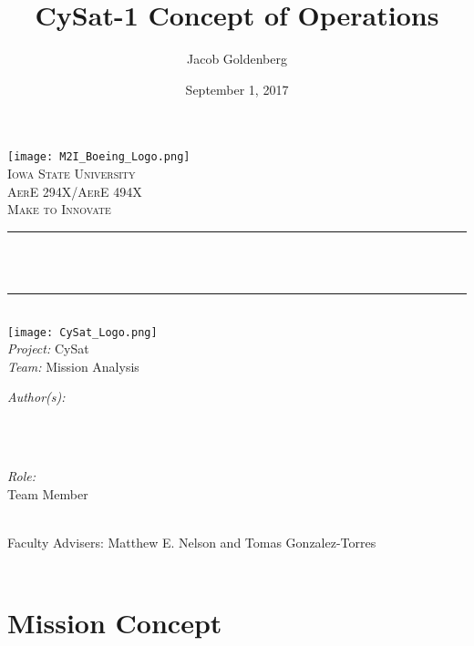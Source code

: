 \documentclass[12pt]{article}
\title{CySat-1 Concept of Operations}
\author{Jacob Goldenberg}
\date{September 1, 2017}
\makeatletter
\newcommand{\members}{}
\newcommand{\role}{Team Member}
\newcommand{\faculty}{Matthew E. Nelson and Tomas Gonzalez-Torres }
\newcommand{\project}{CySat}
\newcommand{\team}{Mission Analysis}
\let\thetitle\@title
\let\theauthor\@author
\let\thedate\@date
\makeatother
\begin{document}
\begin{titlepage}
    \centering
    \texttt{[image: M2I\_Boeing\_Logo.png]}\\[0.5 cm]
    \textsc{\LARGE Iowa State University}\\[1.0 cm] 
    \textsc{\Large AerE 294X/AerE 494X}\\[0.5 cm]
    \textsc{\large Make to Innovate}\\[0.5 cm]
    \rule{\linewidth}{0.2 mm} \\[0.4 cm]
    { \huge \bfseries \thetitle}\\
    \rule{\linewidth}{0.2 mm} \\[1.5 cm]
     \vspace{-8mm}
    \texttt{[image: CySat\_Logo.png]}\\[0.5 cm]
    \emph{Project:}
    \project \ \\
    \emph{Team:}
    \team
    
    \begin{minipage}{0.4\textwidth}
        \begin{flushleft} \large
            \emph{Author(s):}\\
            \theauthor \ \\
            \members
            \end{flushleft}
            \end{minipage}~
            \begin{minipage}{0.4\textwidth}
            \begin{flushright} \large
            \emph{Role:} \\
            \role
        \end{flushright}
    \end{minipage}\\[1 cm]
    {\large Faculty Advisers: \faculty}\\[1 cm]
    {\large \thedate}\\[1 cm]
 
    \vfill
    
\end{titlepage}


\tableofcontents
\pagebreak


\newpage

\section{Mission Concept}
\end{document}
